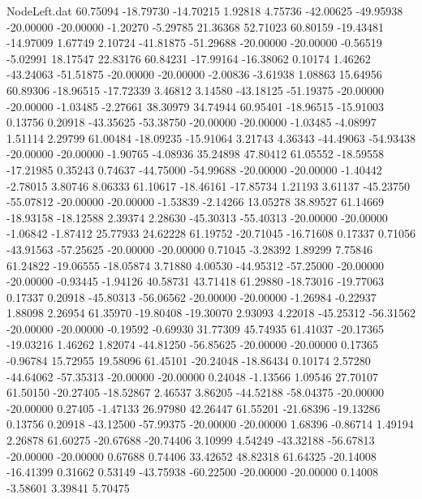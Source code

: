 \begin{filecontents}{NodeLeft.dat}
  60.75094  -18.79730  -14.70215     1.92818    4.75736  -42.00625  -49.95938  -20.00000  -20.00000   -1.20270   -5.29785   21.36368   52.71023
  60.80159  -19.43481  -14.97009     1.67749    2.10724  -41.81875  -51.29688  -20.00000  -20.00000   -0.56519   -5.02991   18.17547   22.83176
  60.84231  -17.99164  -16.38062     0.10174    1.46262  -43.24063  -51.51875  -20.00000  -20.00000   -2.00836   -3.61938    1.08863   15.64956
  60.89306  -18.96515  -17.72339     3.46812    3.14580  -43.18125  -51.19375  -20.00000  -20.00000   -1.03485   -2.27661   38.30979   34.74944
  60.95401  -18.96515  -15.91003     0.13756    0.20918  -43.35625  -53.38750  -20.00000  -20.00000   -1.03485   -4.08997    1.51114    2.29799
  61.00484  -18.09235  -15.91064     3.21743    4.36343  -44.49063  -54.93438  -20.00000  -20.00000   -1.90765   -4.08936   35.24898   47.80412
  61.05552  -18.59558  -17.21985     0.35243    0.74637  -44.75000  -54.99688  -20.00000  -20.00000   -1.40442   -2.78015    3.80746    8.06333
  61.10617  -18.46161  -17.85734     1.21193    3.61137  -45.23750  -55.07812  -20.00000  -20.00000   -1.53839   -2.14266   13.05278   38.89527
  61.14669  -18.93158  -18.12588     2.39374    2.28630  -45.30313  -55.40313  -20.00000  -20.00000   -1.06842   -1.87412   25.77933   24.62228
  61.19752  -20.71045  -16.71608     0.17337    0.71056  -43.91563  -57.25625  -20.00000  -20.00000    0.71045   -3.28392    1.89299    7.75846
  61.24822  -19.06555  -18.05874     3.71880    4.00530  -44.95312  -57.25000  -20.00000  -20.00000   -0.93445   -1.94126   40.58731   43.71418
  61.29880  -18.73016  -19.77063     0.17337    0.20918  -45.80313  -56.06562  -20.00000  -20.00000   -1.26984   -0.22937    1.88098    2.26954
  61.35970  -19.80408  -19.30070     2.93093    4.22018  -45.25312  -56.31562  -20.00000  -20.00000   -0.19592   -0.69930   31.77309   45.74935
  61.41037  -20.17365  -19.03216     1.46262    1.82074  -44.81250  -56.85625  -20.00000  -20.00000    0.17365   -0.96784   15.72955   19.58096
  61.45101  -20.24048  -18.86434     0.10174    2.57280  -44.64062  -57.35313  -20.00000  -20.00000    0.24048   -1.13566    1.09546   27.70107
  61.50150  -20.27405  -18.52867     2.46537    3.86205  -44.52188  -58.04375  -20.00000  -20.00000    0.27405   -1.47133   26.97980   42.26447
  61.55201  -21.68396  -19.13286     0.13756    0.20918  -43.12500  -57.99375  -20.00000  -20.00000    1.68396   -0.86714    1.49194    2.26878
  61.60275  -20.67688  -20.74406     3.10999    4.54249  -43.32188  -56.67813  -20.00000  -20.00000    0.67688    0.74406   33.42652   48.82318
  61.64325  -20.14008  -16.41399     0.31662    0.53149  -43.75938  -60.22500  -20.00000  -20.00000    0.14008   -3.58601    3.39841    5.70475

\end{filecontents}
